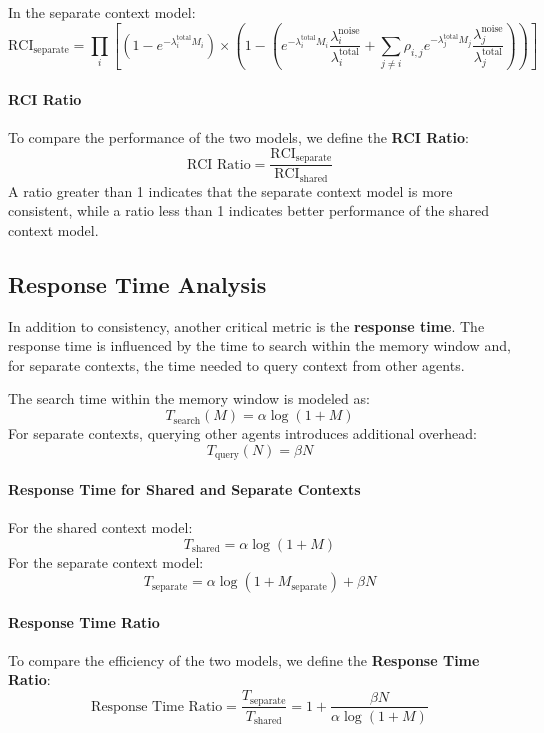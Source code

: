 \documentclass{article}
\begin{document}
In the separate context model:
\[
\text{RCI}_{\text{separate}} = \prod_{i} \left[\left(1 - e^{-\lambda_i^{\text{total}} M_i}\right) \times \left(1 - \left(e^{-\lambda_i^{\text{total}} M_i} \frac{\lambda_i^{\text{noise}}}{\lambda_i^{\text{total}}} + \sum_{j \neq i} \rho_{i,j} e^{-\lambda_j^{\text{total}} M_j} \frac{\lambda_j^{\text{noise}}}{\lambda_j^{\text{total}}}\right)\right)\right]
\]

\paragraph{RCI Ratio}
To compare the performance of the two models, we define the \textbf{RCI Ratio}:
\[
\text{RCI Ratio} = \frac{\text{RCI}_{\text{separate}}}{\text{RCI}_{\text{shared}}}
\]
A ratio greater than 1 indicates that the separate context model is more consistent, while a ratio less than 1 indicates better performance of the shared context model.

\subsection{Response Time Analysis}

In addition to consistency, another critical metric is the \textbf{response time}. The response time is influenced by the time to search within the memory window and, for separate contexts, the time needed to query context from other agents.

The search time within the memory window is modeled as:
\[
T_{\text{search}}(M) = \alpha \log(1 + M)
\]
For separate contexts, querying other agents introduces additional overhead:
\[
T_{\text{query}}(N) = \beta N
\]

\paragraph{Response Time for Shared and Separate Contexts}
For the shared context model:
\[
T_{\text{shared}} = \alpha \log(1 + M)
\]
For the separate context model:
\[
T_{\text{separate}} = \alpha \log(1 + M_{\text{separate}}) + \beta N
\]

\paragraph{Response Time Ratio}
To compare the efficiency of the two models, we define the \textbf{Response Time Ratio}:
\[
\text{Response Time Ratio} = \frac{T_{\text{separate}}}{T_{\text{shared}}} = 1+\frac{\beta N}{\alpha \log(1 + M)}
\]
\end{document}
